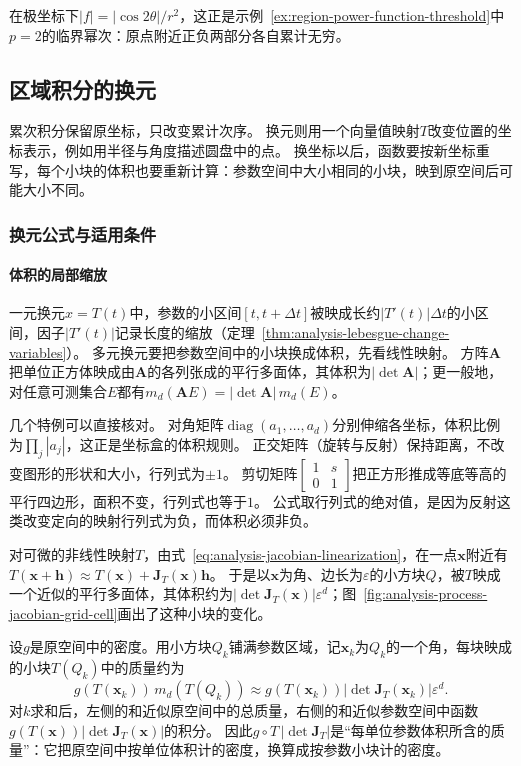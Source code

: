 在极坐标下$|f|=|\cos2\theta|/r^2$，这正是示例~\ref{ex:region-power-function-threshold}中$p=2$的临界幂次：原点附近正负两部分各自累计无穷。

\subsection{区域积分的换元}
\label{sec:multivariable-change-variables}

累次积分保留原坐标，只改变累计次序。
换元则用一个向量值映射$T$改变位置的坐标表示，例如用半径与角度描述圆盘中的点。
换坐标以后，函数要按新坐标重写，每个小块的体积也要重新计算：参数空间中大小相同的小块，映到原空间后可能大小不同。

\subsubsection{换元公式与适用条件}

\paragraph{体积的局部缩放}

一元换元$x=T(t)$中，参数的小区间$[t,t+\Delta t]$被映成长约$|T'(t)|\Delta t$的小区间，因子$|T'(t)|$记录长度的缩放（定理~\ref{thm:analysis-lebesgue-change-variables}）。
多元换元要把参数空间中的小块换成体积，先看线性映射。
方阵$\bm A$把单位正方体映成由$\bm A$的各列张成的平行多面体，其体积为$|\det\bm A|$；更一般地，对任意可测集合$E$都有$m_d(\bm AE)=|\det\bm A|\,m_d(E)$。

几个特例可以直接核对。
对角矩阵$\operatorname{diag}(a_1,\ldots,a_d)$分别伸缩各坐标，体积比例为$\prod_j|a_j|$，这正是坐标盒的体积规则。
正交矩阵（旋转与反射）保持距离，不改变图形的形状和大小，行列式为$\pm1$。
剪切矩阵$\begin{bmatrix}1&s\\0&1\end{bmatrix}$把正方形推成等底等高的平行四边形，面积不变，行列式也等于$1$。
公式取行列式的绝对值，是因为反射这类改变定向的映射行列式为负，而体积必须非负。

对可微的非线性映射$T$，由式~\eqref{eq:analysis-jacobian-linearization}，在一点$\bm x$附近有$T(\bm x+\bm h)\approx T(\bm x)+\bm J_T(\bm x)\bm h$。
于是以$\bm x$为角、边长为$\varepsilon$的小方块$Q$，被$T$映成一个近似的平行多面体，其体积约为$|\det\bm J_T(\bm x)|\varepsilon^d$；图~\ref{fig:analysis-process-jacobian-grid-cell}画出了这种小块的变化。

设$g$是原空间中的密度。用小方块$Q_k$铺满参数区域，记$\bm x_k$为$Q_k$的一个角，每块映成的小块$T(Q_k)$中的质量约为
\[
 g(T(\bm x_k))\,m_d(T(Q_k))\approx g(T(\bm x_k))|\det\bm J_T(\bm x_k)|\varepsilon^d.
\]
对$k$求和后，左侧的和近似原空间中的总质量，右侧的和近似参数空间中函数$g(T(\bm x))|\det\bm J_T(\bm x)|$的积分。
因此$g\circ T\,|\det\bm J_T|$是“每单位参数体积所含的质量”：它把原空间中按单位体积计的密度，换算成按参数小块计的密度。

